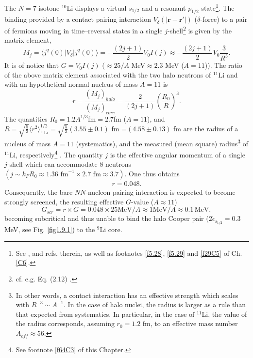   The $N=7$ isotone $^{10}$Li displays a virtual $s_{1/2}$ and a resonant $p_{1/2}$ state\footnote{See  \cite{Barranco:20}, \cite{Moro:19} and refs. therein, as well as footnotes \ref{f5.28},   \ref{f5.29}  and \ref{f29C5} of Ch. \ref{C6}.}. 
The binding provided by a contact pairing interaction $V_\delta (|\mathbf{r}-\mathbf{r}'|)$ ($\delta$-force) to a pair of fermions moving in time--reversal states in a single $j$-shell\footnote{cf. e.g. Eq. (2.12) \cite{Brink:05}.} is given by the matrix element,
\begin{equation}
M_j=\langle j^2(0)|V_\delta|j^2(0)\rangle=-\frac{(2j+1)}{2} V_0 I(j)\approx -\frac{(2j+1)}{2}V_0\frac{3}{R^3}.
\end{equation} 
It is of notice that $G=V_0I(j)$ ($\approx 25/A$ MeV$\approx 2.3$ MeV ($A=11$)). 
The ratio of the above matrix element associated with the two halo neutrons of $^{11}$Li and with an hypothetical normal nucleus of mass $A=11$ is
\begin{equation}\label{eq3.6.2}
r=\frac{(M_j)_{halo}}{(M_j)_{core}}=\frac{2}{(2j+1)}\left(\frac{R_0}{R}\right)^3.
\end{equation}
The quantities $R_0=1.2 A^{1/3}$fm$=2.7$fm ($A=11$), and $R=\sqrt{\frac{5}{3}}\langle r^2\rangle^{1/2}_{^{11}\text{Li}}=\sqrt{\frac{5}{3}}(3.55\pm0.1)$ fm =$(4.58\pm 0.13)$ fm are the radius of a  nucleus of mass $A=11$ (systematics), and  the measured (mean square) radius\footnote{In other words, a contact interaction has an effective strength which scales with $R^{-3}\sim A^{-1}$. In the case of halo nuclei, the radius is larger as a rule than that expected from systematics. In particular, in the case of $^{11}$Li, the value of the radius corresponds, assuming $r_0=1.2$ fm, to an effective mass number $A_{eff}\approx56$.} of $^{11}$Li, respectively\footnote{See footnote \ref{f64C3} of this Chapter.} . The quantity $j$ is the effective angular momentum of a single $j$-shell which can accommodate 8 neutrons $(j\sim k_F R_0\approx 1.36 \text{ fm}^{-1}\times2.7\text{ fm}\approx3.7)$. One thus obtains
\begin{align}\label{eq2.6.3}
r=0.048.
\end{align}
 Consequently, the bare $NN$-nucleon pairing interaction is expected to become strongly screened, the resulting effective $G$-value ($A\approx11$) 
\begin{equation}\label{eq1C2AppF}
G_{scr}=r\times G=0.048\times 25 \text{MeV}/A\approx 1 \text{MeV}/A\approx 0.1\,\text{MeV},
\end{equation}
becoming subcritical and thus unable to bind the halo Cooper pair ($2\tilde \epsilon_{s_{1/2}}=0.3$ MeV, see Fig. \ref{fig1.9.1}) to the $^9$Li core.





